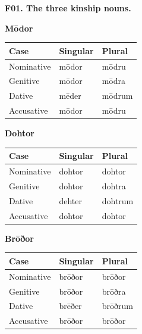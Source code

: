 \textbf{F01. The three kinship nouns.}

\textbf{Mōdor}

\par\begingroup
\fontsize{10.5}{13.2}\selectfont
\setlength{\LTleft}{0pt}\setlength{\LTright}{\fill}
\noindent
\begin{tabular}{@{}>{\raggedright\arraybackslash}p{39.46mm}>{\raggedright\arraybackslash}p{39.46mm}>{\raggedright\arraybackslash}p{39.46mm}@{}}
\toprule
\textbf{Case} & \textbf{Singular} & \textbf{Plural} \\
\midrule
Nominative & mōdor & mōdru \\
Genitive & mōdor & mōdra \\
Dative & mēder & mōdrum \\
Accusative & mōdor & mōdru \\
\bottomrule
\end{tabular}
\par\endgroup

\textbf{Dohtor}

\par\begingroup
\fontsize{10.5}{13.2}\selectfont
\setlength{\LTleft}{0pt}\setlength{\LTright}{\fill}
\noindent
\begin{tabular}{@{}>{\raggedright\arraybackslash}p{39.46mm}>{\raggedright\arraybackslash}p{39.46mm}>{\raggedright\arraybackslash}p{39.46mm}@{}}
\toprule
\textbf{Case} & \textbf{Singular} & \textbf{Plural} \\
\midrule
Nominative & dohtor & dohtor \\
Genitive & dohtor & dohtra \\
Dative & dehter & dohtrum \\
Accusative & dohtor & dohtor \\
\bottomrule
\end{tabular}
\par\endgroup

\textbf{Brōðor}

\par\begingroup
\fontsize{10.5}{13.2}\selectfont
\setlength{\LTleft}{0pt}\setlength{\LTright}{\fill}
\noindent
\begin{tabular}{@{}>{\raggedright\arraybackslash}p{39.46mm}>{\raggedright\arraybackslash}p{39.46mm}>{\raggedright\arraybackslash}p{39.46mm}@{}}
\toprule
\textbf{Case} & \textbf{Singular} & \textbf{Plural} \\
\midrule
Nominative & brōðor & brōðor \\
Genitive & brōðor & brōðra \\
Dative & brēðer & brōðrum \\
Accusative & brōðor & brōðor \\
\bottomrule
\end{tabular}
\par\endgroup


